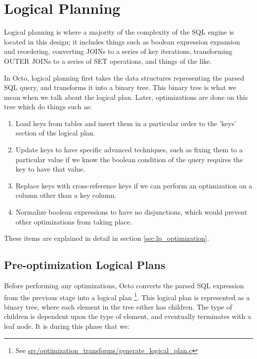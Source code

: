 \documentclass[]{article}
\newcommand{\gitlab}[1]{\footnote{See \href{https://gitlab.com/YottaDB/DBMS/YDBOcto/blob/master/#1}{#1}}}
\begin{document}

\section{Logical Planning}

Logical planning is where a majority of the complexity of the SQL engine is located in this design; it includes things such as boolean expression expansion and reordering, converting JOINs to a series of key iterations, transforming OUTER JOINs to a series of SET operations, and things of the like.

In Octo, logical planning first takes the data structures representing the parsed SQL query, and transforms it into a binary tree.
This binary tree is what we mean when we talk about the logical plan.
Later, optimizations are done on this tree which do things such as:

\begin{enumerate}
	\item Load keys from tables and insert them in a particular order to the 'keys' section of the logical plan.
	\item Update keys to have specific advanced techniques, such as fixing them to a particular value if we know the boolean condition of the query requires the key to have that value.
	\item Replace keys with cross-reference keys if we can perform an optimization on a column other than a key column.
	\item Normalize boolean expressions to have no disjunctions, which would prevent other optimizations from taking place.
\end{enumerate}

These items are explained in detail in section \ref{sec:lp_optimization}.

\subsection{Pre-optimization Logical Plans}

Before performing any optimizations, Octo converts the parsed SQL expression from the previous stage into a logical plan \gitlab{src/optimization\_transforms/generate\_logical\_plan.c}.
This logical plan is represented as a binary tree, where each element in the tree either has children. The type of children is dependent upon the type of element, and eventually terminates with a leaf node.
It is during this phase that we:
\end{document}

